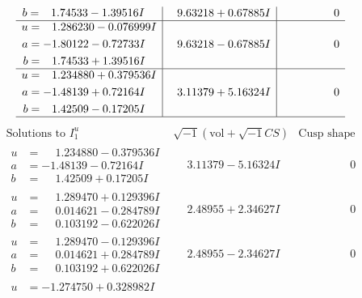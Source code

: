 \documentclass[1p]{elsarticle_modified}
\theoremstyle{definition}
\newcommand{\I}{\sqrt{-1}}
\begin{document}
$$\begin{array}{c|c|c}
\begin{aligned}
b &= \phantom{-}1.74533 - 1.39516 I\end{aligned}
 & \phantom{-}9.63218 + 0.67885 I & \phantom{-0.000000 } 0 \\ \hline\begin{aligned}
u &= \phantom{-}1.286230 - 0.076999 I \\
a &= -1.80122 - 0.72733 I \\
b &= \phantom{-}1.74533 + 1.39516 I\end{aligned}
 & \phantom{-}9.63218 - 0.67885 I & \phantom{-0.000000 } 0 \\ \hline\begin{aligned}
u &= \phantom{-}1.234880 + 0.379536 I \\
a &= -1.48139 + 0.72164 I \\
b &= \phantom{-}1.42509 - 0.17205 I\end{aligned}
 & \phantom{-}3.11379 + 5.16324 I & \phantom{-0.000000 } 0\\
 \hline 
 \end{array}$$\newpage$$\begin{array}{c|c|c}  
\text{Solutions to }I^u_{1}& \I (\text{vol} + \sqrt{-1}CS) & \text{Cusp shape}\\
 \hline 
\begin{aligned}
u &= \phantom{-}1.234880 - 0.379536 I \\
a &= -1.48139 - 0.72164 I \\
b &= \phantom{-}1.42509 + 0.17205 I\end{aligned}
 & \phantom{-}3.11379 - 5.16324 I & \phantom{-0.000000 } 0 \\ \hline\begin{aligned}
u &= \phantom{-}1.289470 + 0.129396 I \\
a &= \phantom{-}0.014621 - 0.284789 I \\
b &= \phantom{-}0.103192 - 0.622026 I\end{aligned}
 & \phantom{-}2.48955 + 2.34627 I & \phantom{-0.000000 } 0 \\ \hline\begin{aligned}
u &= \phantom{-}1.289470 - 0.129396 I \\
a &= \phantom{-}0.014621 + 0.284789 I \\
b &= \phantom{-}0.103192 + 0.622026 I\end{aligned}
 & \phantom{-}2.48955 - 2.34627 I & \phantom{-0.000000 } 0 \\ \hline\begin{aligned}
u &= -1.274750 + 0.328982 I \\

\end{aligned}
\end{array}$$
\end{document}
